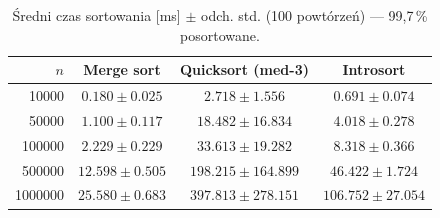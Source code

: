 \begin{table}[H]
\centering
\caption{Średni czas sortowania [ms] $\pm$ odch. std. (100 powtórzeń) — 99,7\,\% posortowane.}
\label{tab:summary_sorted_99_7}
\begin{tabular}{rccc}
\toprule
$n$ & Merge sort & Quicksort (med-3) & Introsort \\
\midrule
\num{10000} & $0.180 \pm 0.025$ & $2.718 \pm 1.556$ & $0.691 \pm 0.074$ \\
\num{50000} & $1.100 \pm 0.117$ & $18.482 \pm 16.834$ & $4.018 \pm 0.278$ \\
\num{100000} & $2.229 \pm 0.229$ & $33.613 \pm 19.282$ & $8.318 \pm 0.366$ \\
\num{500000} & $12.598 \pm 0.505$ & $198.215 \pm 164.899$ & $46.422 \pm 1.724$ \\
\num{1000000} & $25.580 \pm 0.683$ & $397.813 \pm 278.151$ & $106.752 \pm 27.054$ \\
\bottomrule
\end{tabular}
\end{table}
